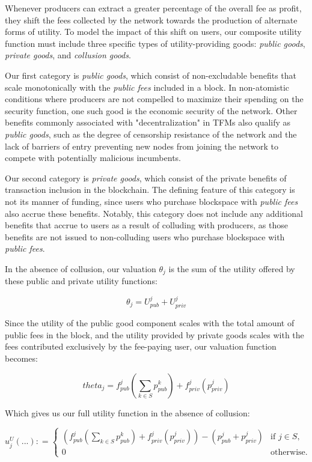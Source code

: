 \documentclass[oneside]{article}   	%
\begin{document}
Whenever producers can extract a greater percentage of the overall fee as profit, they shift the fees collected by the network towards the production of alternate forms of utility. To model the impact of this shift on users, our composite utility function must include three specific types of utility-providing goods: \textit{public goods}, \textit{private goods}, and \textit{collusion goods}.

Our first category is \textit{public goods}, which consist of non-excludable benefits that scale monotonically with the \textit{public fees} included in a block. In non-atomistic conditions where producers are not compelled to maximize their spending on the security function, one such good is the economic security of the network. Other benefits commonly associated with "decentralization" in TFMs also qualify as \textit{public goods}, such as the degree of censorship resistance of the network and the lack of barriers of entry preventing new nodes from joining the network to compete with potentially malicious incumbents.

Our second category is \textit{private goods}, which consist of the private benefits of transaction inclusion in the blockchain. The defining feature of this category is not its manner of funding, since users who purchase blockspace with \textit{public fees} also accrue these benefits. Notably, this category does not include any additional benefits that accrue to users as a result of colluding with producers, as those benefits are not issued to non-colluding users who purchase blockspace with \textit{public fees}.

In the absence of collusion, our valuation $\theta_j$ is the sum of the utility offered by these public and private utility functions:

$$
\theta_j = U_{pub}^j + U_{priv}^j
$$

Since the utility of the public good component scales with the total amount of public fees in the block, and the utility provided by private goods scales with the fees contributed exclusively by the fee-paying user, our valuation function becomes:

$$
theta_j = f_{pub}^j\left(\sum_{k \in S} p_{pub}^{k}\right) + f_{priv}^j(p_{priv}^j)
$$

Which gives us our full utility function in the absence of collusion:

\[
u_j^U\left(...\right) : =
\begin{cases}
\left(
        f_{pub}^j
                \left(\sum_{k \in S} p_{pub}^{k}\right)
                + f_{priv}^j(p_{priv}^j)
\right)  -   \left(p_{pub}^j + p_{priv}^j\right) & \text{if } j \in S, \\ 0 & \text{otherwise.}
\end{cases}
\]
\end{document}

